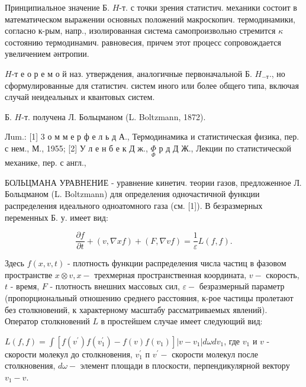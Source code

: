 \documentclass[10pt]{article}
\begin{document}
Принципиальное значение Б. $H$-т. с точки зрения статистич. механики состоит в математическом выражении основных положений макроскопич. термодинамики, согласно к-рым, напр., изолированная система самопроизвольно стремится $\kappa$ состоянию термодинамич. равновесия, причем этот процесс сопровождается увеличением әнтропии.



$H$-т е о р е м о й наз. утверждения, аналогичные первоначальной Б. $H_{-т}$., но сформулированные для статистич. систем иного или более общего типа, включая случай неидеальных и квантовых систем.



Б. $H$-т. получена Л. Больцманом (L. Boltzmann, 1872).



Лum.: [1] 3 о м м е р ф е л ь д А., Термодинамика и статистическая физика, пер. с нем., М., 1955; [2] У л е н б е к Д ж., $\underset{\Phi}{\Phi}$ р д Д Ж., Лекции по статистической механике, пер. с англ.,



БОЛЬЦМАНА УРАВНЕНИЕ - уравнение кинетич. теории газов, предложенное Л. Больцманом (L. Boltzmann) для определения одночастичной функции распределения идеального одноатомного газа (см. [1]). В безразмерных переменных Б. у. имеет вид:



\[

\frac{\partial f}{\partial t}+(v, \nabla x f)+(F, \nabla v f)=\frac{1}{\varepsilon} L(f, f) .

\]



Здесь $f(x, v, t)$ - плотность функции распределения числа частиц в фазовом пространстве $x \otimes v, x-$ трехмерная пространственная координата, $v-$ скорость, $t$ - время, $F$ - плотность внешних массовых сил, $\varepsilon-$ безразмерный параметр (пропорциональный отношению среднего расстояния, к-рое частицы пролетают без столкновений, к характерному масштабу рассматриваемых явлений). Оператор столкновений $L$ в простейшем случае имеет следующий вид:



$L(f, f)=\int\left[f\left(v^{\prime}\right) f\left(v_{1}^{\prime}\right)-f(v) f\left(v_{1}\right)\right]\left|v-v_{1}\right| d \omega d v_{1}$, где $v_{1}$ и $v$ - скорости молекул до столкновения, $v_{1}^{\prime}$ п $v^{\prime}-$ скорости молекул после столкновения, $d \omega-$ элемент площади в плоскости, перпендикулярной вектору $v_{1}-v$.
\end{document}
